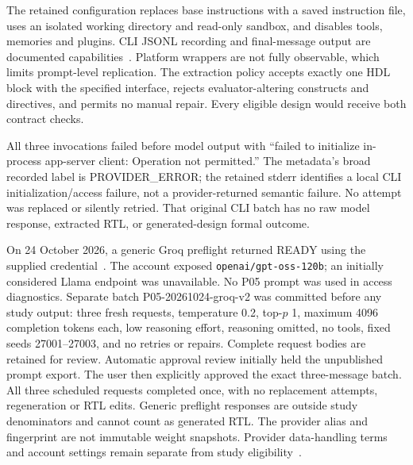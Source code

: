 \documentclass[11pt,a4paper]{article}
\begin{document}
The retained configuration replaces base instructions with a saved instruction file, uses an isolated working directory and read-only sandbox, and disables tools, memories and plugins. CLI JSONL recording and final-message output are documented capabilities~\cite{codexexec,codexconfig}. Platform wrappers are not fully observable, which limits prompt-level replication. The extraction policy accepts exactly one HDL block with the specified interface, rejects evaluator-altering constructs and directives, and permits no manual repair. Every eligible design would receive both contract checks.

All three invocations failed before model output with ``failed to initialize in-process app-server client: Operation not permitted.'' The metadata's broad recorded label is PROVIDER\_ERROR; the retained stderr identifies a local CLI initialization/access failure, not a provider-returned semantic failure. No attempt was replaced or silently retried. That original CLI batch has no raw model response, extracted RTL, or generated-design formal outcome.

On 24 October 2026, a generic Groq preflight returned READY using the supplied credential~\cite{groqmodel,groqapi}. The account exposed \texttt{openai/gpt-oss-120b}; an initially considered Llama endpoint was unavailable. No P05 prompt was used in access diagnostics. Separate batch P05-20261024-groq-v2 was committed before any study output: three fresh requests, temperature 0.2, top-$p$ 1, maximum 4096 completion tokens each, low reasoning effort, reasoning omitted, no tools, fixed seeds 27001--27003, and no retries or repairs. Complete request bodies are retained for review. Automatic approval review initially held the unpublished prompt export. The user then explicitly approved the exact three-message batch. All three scheduled requests completed once, with no replacement attempts, regeneration or RTL edits. Generic preflight responses are outside study denominators and cannot count as generated RTL. The provider alias and fingerprint are not immutable weight snapshots. Provider data-handling terms and account settings remain separate from study eligibility~\cite{groqdata}.

\begin{table}[ht]
\centering\small
\caption{Batch-specific flow. Total flow retains failures; provider performance is not pooled.}
\label{tab:flow}
\end{table}
\begin{table}[ht]
\centering\small
\caption{All scheduled API samples under the same frozen contracts. The original CLI failures remain separate.}
\label{tab:paired}
\end{table}
\end{document}
